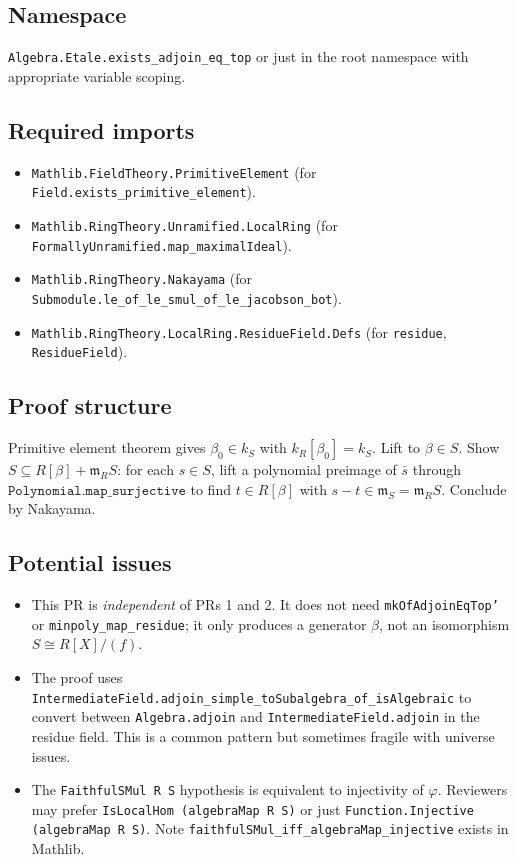 \subsection*{Namespace}

\texttt{Algebra.Etale.exists\_adjoin\_eq\_top} or just in the root namespace
with appropriate variable scoping.

\subsection*{Required imports}
\begin{itemize}
  \item \texttt{Mathlib.FieldTheory.PrimitiveElement}
    (for \texttt{Field.exists\_primitive\_element}).
  \item \texttt{Mathlib.RingTheory.Unramified.LocalRing}
    (for \texttt{FormallyUnramified.}\allowbreak\texttt{map\_maximalIdeal}).
  \item \texttt{Mathlib.RingTheory.Nakayama}
    (for \texttt{Submodule.le\_of\_le\_smul\_of\_le\_}\allowbreak\texttt{jacobson\_bot}).
  \item \texttt{Mathlib.RingTheory.LocalRing.ResidueField.Defs}
    (for \texttt{residue}, \texttt{ResidueField}).
\end{itemize}

\subsection*{Proof structure}

Primitive element theorem gives $\beta_0 \in k_S$ with $k_R[\beta_0] = k_S$.
Lift to $\beta \in S$.
Show $S \subseteq R[\beta] + \mathfrak{m}_R S$: for each $s \in S$,
lift a polynomial preimage of $\bar s$ through
$\mathtt{Polynomial.map\_surjective}$ to find $t \in R[\beta]$
with $s - t \in \mathfrak{m}_S = \mathfrak{m}_R S$.
Conclude by Nakayama.

\subsection*{Potential issues}
\begin{itemize}
  \item This PR is \emph{independent} of PRs 1 and 2.
    It does not need \texttt{mkOfAdjoinEqTop'} or
    \texttt{minpoly\_map\_residue}; it only produces a generator $\beta$,
    not an isomorphism $S \cong R[X]/(f)$.
  \item The proof uses \texttt{IntermediateField.adjoin\_simple\_toSubalgebra\_of\_isAlgebraic}
    to convert between \texttt{Algebra.adjoin} and \texttt{IntermediateField.adjoin}
    in the residue field. This is a common pattern but sometimes fragile with
    universe issues.
  \item The \texttt{FaithfulSMul R S} hypothesis is equivalent to injectivity
    of $\varphi$. Reviewers may prefer \texttt{IsLocalHom (algebraMap R S)}
    or just \texttt{Function.Injective (algebraMap R S)}.
    Note \texttt{faithfulSMul\_iff\_algebraMap\_injective} exists in Mathlib.
\end{itemize}



